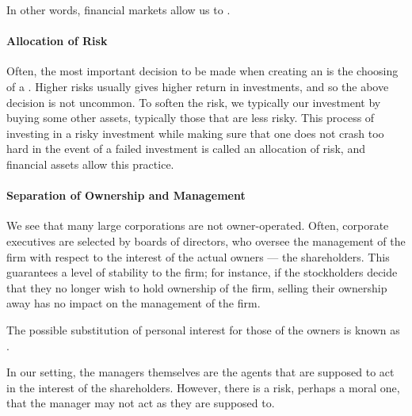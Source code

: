 \documentclass[notoc,notitlepage]{tufte-book}
\begin{document}
In other words, financial markets allow us to .

\paragraph{Allocation of Risk} Often, the most important decision to be made when
creating an  is the choosing of a .
Higher risks usually gives higher return in investments,
and so the above decision is not uncommon.
To soften the risk, we typically  our investment
by buying some other assets, typically those that are less risky.
This process of investing in a risky investment while making sure that
one does not crash too hard in the event of a failed investment is called
an allocation of risk, and financial assets allow this practice.

\paragraph{Separation of Ownership and Management}
We see that many large corporations are not owner-operated.
Often, corporate executives are selected by boards of directors,
who oversee the management of the firm with respect to the interest
of the actual owners --- the shareholders. 
This guarantees a level of stability to the firm; for instance,
if the stockholders decide that they no longer wish
to hold ownership of the firm,
selling their ownership away has no impact on the management of the firm.

\begin{defn}\label{defn:the_agency_problem}
  The possible substitution of personal interest for those of the owners
  is known as .
\end{defn}

In our setting, the managers themselves are the agents that are supposed
to act in the interest of the shareholders.
However, there is a risk, perhaps a moral one, that the manager may not
act as they are supposed to.
\end{document}
